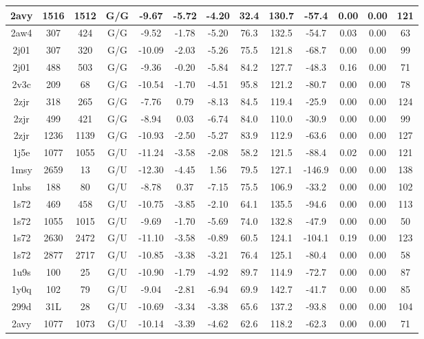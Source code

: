 {\begin{center}
\begin{longtable}{|c|c|c|c|c|c|c|c|c|c|c|c|c|}
2avy & 1516 & 1512 & G/G & -9.67 & -5.72 & -4.20 & 32.4 & 130.7 & -57.4 & 0.00 & 0.00 & 121 \\ \hline
2aw4 & 307 & 424 & G/G & -9.52 & -1.78 & -5.20 & 76.3 & 132.5 & -54.7 & 0.03 & 0.00 & 63 \\ \hline
2j01 & 307 & 320 & G/G & -10.09 & -2.03 & -5.26 & 75.5 & 121.8 & -68.7 & 0.00 & 0.00 & 99 \\ \hline
2j01 & 488 & 503 & G/G & -9.36 & -0.20 & -5.84 & 84.2 & 127.7 & -48.3 & 0.16 & 0.00 & 71 \\ \hline
2v3c & 209 & 68 & G/G & -10.54 & -1.70 & -4.51 & 95.8 & 121.2 & -80.7 & 0.00 & 0.00 & 78 \\ \hline
2zjr & 318 & 265 & G/G & -7.76 & 0.79 & -8.13 & 84.5 & 119.4 & -25.9 & 0.00 & 0.00 & 124 \\ \hline
2zjr & 499 & 421 & G/G & -8.94 & 0.03 & -6.74 & 84.0 & 110.0 & -30.9 & 0.00 & 0.00 & 99 \\ \hline
2zjr & 1236 & 1139 & G/G & -10.93 & -2.50 & -5.27 & 83.9 & 112.9 & -63.6 & 0.00 & 0.00 & 127 \\ \hline
1j5e & 1077 & 1055 & G/U & -11.24 & -3.58 & -2.08 & 58.2 & 121.5 & -88.4 & 0.02 & 0.00 & 121 \\ \hline
1msy & 2659 & 13 & G/U & -12.30 & -4.45 & 1.56 & 79.5 & 127.1 & -146.9 & 0.00 & 0.00 & 138 \\ \hline
1nbs & 188 & 80 & G/U & -8.78 & 0.37 & -7.15 & 75.5 & 106.9 & -33.2 & 0.00 & 0.00 & 102 \\ \hline
1s72 & 469 & 458 & G/U & -10.75 & -3.85 & -2.10 & 64.1 & 135.5 & -94.6 & 0.00 & 0.00 & 113 \\ \hline
1s72 & 1055 & 1015 & G/U & -9.69 & -1.70 & -5.69 & 74.0 & 132.8 & -47.9 & 0.00 & 0.00 & 50 \\ \hline
1s72 & 2630 & 2472 & G/U & -11.10 & -3.58 & -0.89 & 60.5 & 124.1 & -104.1 & 0.19 & 0.00 & 123 \\ \hline
1s72 & 2877 & 2717 & G/U & -10.85 & -3.38 & -3.21 & 76.4 & 125.1 & -80.4 & 0.00 & 0.00 & 58 \\ \hline
1u9s & 100 & 25 & G/U & -10.90 & -1.79 & -4.92 & 89.7 & 114.9 & -72.7 & 0.00 & 0.00 & 87 \\ \hline
1y0q & 102 & 79 & G/U & -9.04 & -2.81 & -6.94 & 69.9 & 142.7 & -41.7 & 0.00 & 0.00 & 85 \\ \hline
299d & 31L & 28 & G/U & -10.69 & -3.34 & -3.38 & 65.6 & 137.2 & -93.8 & 0.00 & 0.00 & 104 \\ \hline
2avy & 1077 & 1073 & G/U & -10.14 & -3.39 & -4.62 & 62.6 & 118.2 & -62.3 & 0.00 & 0.00 & 71 \\ \hline

\end{longtable}
\end{center}}
